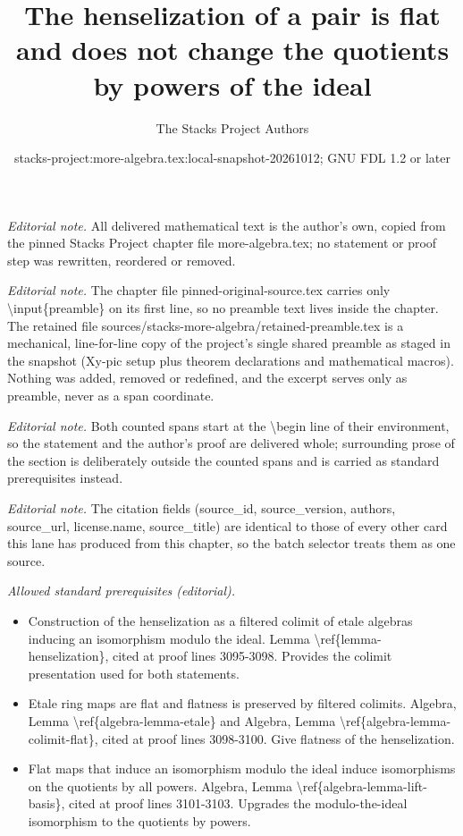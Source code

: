 \documentclass[10pt,a4paper]{amsart}
\title{The henselization of a pair is flat and does not change the quotients by powers of the ideal}
\author{The Stacks Project Authors}
\date{stacks-project:more-algebra.tex:local-snapshot-20261012; GNU FDL 1.2 or later}
\theoremstyle{plain}
\theoremstyle{definition}
\theoremstyle{remark}
\numberwithin{equation}{subsection}
\begin{document}
\maketitle
\setcounter{subsection}{1}
\noindent\textit{Editorial note.} All delivered mathematical text is the author's own, copied from the pinned Stacks Project chapter file more-algebra.tex; no statement or proof step was rewritten, reordered or removed.\par\medskip
\noindent\textit{Editorial note.} The chapter file pinned-original-source.tex carries only \textbackslash{}input\{preamble\} on its first line, so no preamble text lives inside the chapter. The retained file sources/stacks-more-algebra/retained-preamble.tex is a mechanical, line-for-line copy of the project's single shared preamble as staged in the snapshot (Xy-pic setup plus theorem declarations and mathematical macros). Nothing was added, removed or redefined, and the excerpt serves only as preamble, never as a span coordinate.\par\medskip
\noindent\textit{Editorial note.} Both counted spans start at the \textbackslash{}begin line of their environment, so the statement and the author's proof are delivered whole; surrounding prose of the section is deliberately outside the counted spans and is carried as standard prerequisites instead.\par\medskip
\noindent\textit{Editorial note.} The citation fields (source\_id, source\_version, authors, source\_url, license.name, source\_title) are identical to those of every other card this lane has produced from this chapter, so the batch selector treats them as one source.\par\medskip
\noindent\textit{Allowed standard prerequisites (editorial).}\begin{itemize}
\item Construction of the henselization as a filtered colimit of etale algebras inducing an isomorphism modulo the ideal. Lemma \textbackslash{}ref\{lemma-henselization\}, cited at proof lines 3095-3098. Provides the colimit presentation used for both statements.
\item Etale ring maps are flat and flatness is preserved by filtered colimits. Algebra, Lemma \textbackslash{}ref\{algebra-lemma-etale\} and Algebra, Lemma \textbackslash{}ref\{algebra-lemma-colimit-flat\}, cited at proof lines 3098-3100. Give flatness of the henselization.
\item Flat maps that induce an isomorphism modulo the ideal induce isomorphisms on the quotients by all powers. Algebra, Lemma \textbackslash{}ref\{algebra-lemma-lift-basis\}, cited at proof lines 3101-3103. Upgrades the modulo-the-ideal isomorphism to the quotients by powers.
\end{itemize}\medskip
\end{document}
